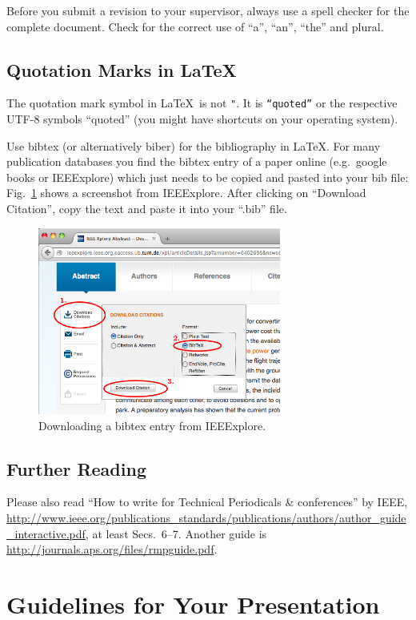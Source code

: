\documentclass[journal]{IEEEtran}
\begin{document}
Before you submit a revision to your supervisor, always use a spell checker for the complete document. Check for the correct use of “a”, “an”, “the” and plural.

\subsection{Quotation Marks in \LaTeX}

The quotation mark symbol in \LaTeX\ is not \texttt{"}. It is \texttt{``quoted''} or the respective UTF-8 symbols “quoted” (you might have shortcuts on your operating system).

Use bibtex (or alternatively biber) for the bibliography in \LaTeX{}. For many publication databases you find the bibtex entry of a paper online (e.g.\ google books or IEEExplore) which just needs to be copied and pasted into your bib file: Fig.~\ref{IEEExplore.png} shows a screenshot from IEEExplore. After clicking on “Download Citation”, copy the text and paste it into your “.bib” file.

\begin{figure}[h!]
	\centering
	\includegraphics[width=8cm]{Images/IEEExplore.png}
	\caption{Downloading a bibtex entry from IEEExplore.}
	\label{IEEExplore.png}
\end{figure}


\subsection{Further Reading}

Please also read “How to write for Technical Periodicals \& conferences” by IEEE, \url{http://www.ieee.org/publications_standards/publications/authors/author_guide_interactive.pdf}, at least Secs.~6--7. Another guide is \url{http://journals.aps.org/files/rmpguide.pdf}.


\section{Guidelines for Your Presentation}
\end{document}
